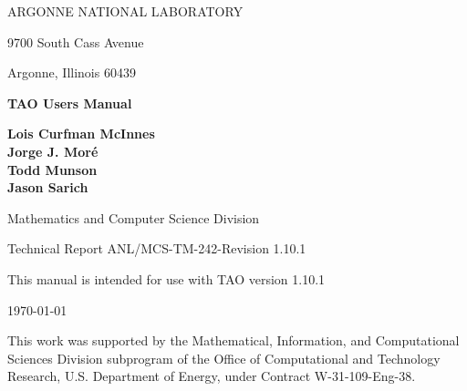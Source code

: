 
\vspace{1.75in}

\begin{center}

ARGONNE NATIONAL LABORATORY

9700 South Cass Avenue

Argonne, Illinois  60439

\vspace{1.5in}

{\Large
{\bf 
TAO Users Manual
}
}

\vspace{.5in}

{\bf Lois Curfman McInnes \\ Jorge J. Mor\'e \\ Todd Munson \\ Jason Sarich}

\vspace{.5in}

Mathematics and Computer Science Division

\vspace{.25in}

Technical Report  ANL/MCS-TM-242-Revision 1.10.1

\vspace{.25in}

This manual is intended for use with TAO version 1.10.1

\vspace{1.0in}

\today
\end{center}

\vspace{1.5in}

\par\noindent
This work was supported by the Mathematical, Information,
and Computational Sciences Division subprogram of the
Office of Computational and Technology Research,
U.S. Department of Energy, under Contract W-31-109-Eng-38.

